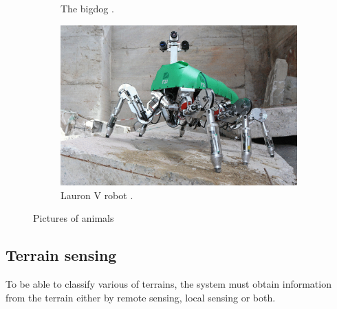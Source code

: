 \documentclass[USenglish]{ifimaster}  %
\begin{document}
\begin{figure}
\begin{subfigure}[b]{0.22\textwidth}
		\caption{The bigdog \cite{Raibert200810822}.}
		\label{fig:bigDog}
	\end{subfigure}\hfill
	\begin{subfigure}[b]{0.22\textwidth}
		\centering
		\includegraphics[width=\linewidth]{Figures/Lauron}
		\caption{Lauron V robot \cite{6878051}.}
		\label{fig:LAURON}
	\end{subfigure}
	\caption{Pictures of animals}\label{fig:robots}
\end{figure}

\FloatBarrier


\subsection{Terrain sensing}
To be able to classify various of terrains, the system must obtain information from the terrain either by remote sensing, local sensing or both.
\end{document}

